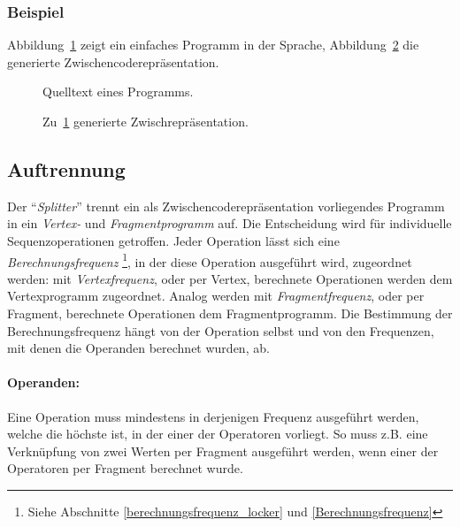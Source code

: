 \documentclass[twoside,a4paper,fleqn,12pt]{article}
\begin{document}

\subsubsection{Beispiel}

Abbildung~\ref{fig:ir_sample_src} zeigt ein einfaches Programm in der Sprache, Abbildung~\ref{fig:ir_sample_gen} die generierte Zwischencoderepräsentation.

\begin{figure}[h]
   \centering
  
  \caption{Quelltext eines Programms.}
  \label{fig:ir_sample_src}
\end{figure}
\begin{figure}[h]
   \centering
  
  \caption{Zu~\ref{fig:ir_sample_src} generierte Zwischrepräsentation.}
  \label{fig:ir_sample_gen}
\end{figure}

\subsection{Auftrennung}
\label{Auftrennung}

Der "`\emph{Splitter}"' trennt ein als Zwischencoderepräsentation vorliegendes Programm in ein \emph{Vertex-} und \emph{Fragmentprogramm} auf.
Die Entscheidung wird für individuelle Sequenzoperationen getroffen. Jeder Operation lässt sich eine \emph{Berechnungsfrequenz}
\footnote{Siehe Abschnitte \ref{berechnungsfrequenz_locker} und \ref{Berechnungsfrequenz}},
in der diese Operation ausgeführt wird, zugeordnet werden: mit \emph{Vertexfrequenz}, oder per Vertex, berechnete Operationen werden dem Vertexprogramm zugeordnet.
Analog werden mit \emph{Fragmentfrequenz}, oder per Fragment, berechnete Operationen dem Fragmentprogramm. Die Bestimmung der Berechnungsfrequenz hängt von der Operation selbst
und von den Frequenzen, mit denen die Operanden berechnet wurden, ab. 

\paragraph{Operanden:} Eine Operation muss mindestens in derjenigen Frequenz ausgeführt werden, welche die höchste ist, in der einer der Operatoren
vorliegt. So muss z.B. eine Verknüpfung von zwei Werten per Fragment ausgeführt werden, wenn einer der Operatoren per Fragment berechnet wurde.
\end{document}
